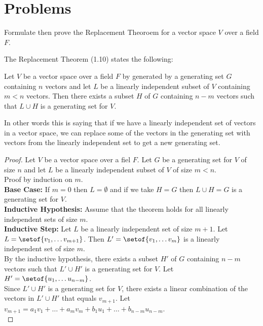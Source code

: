 \documentclass[answers,12pt,addpoints]{exam}
\begin{document}
\section{Problems}
\begin{questions}
    \question Formulate then prove the Replacement Theoroem for a vector space $V$ over a field $F$.\\
    \begin{solution}
        The Replacement Theorem (1.10) states the following: 
        \begin{theorem}
            Let $V$ be a vector space over a field $F$ by generated by a generating set $G$ containing $n$ vectors and let $L$ be a linearly independent subset of $V$ containing $m < n$ vectors. Then there exists a subset $H$ of $G$ containing $n-m$ vectors such that $L \cup H$ is a generating set for $V$.
        \end{theorem}
        In other words this is saying that if we have a linearly independent set of vectors in a vector space, we can replace some of the vectors in the generating set with vectors from the linearly independent set to get a new generating set.\\
        \begin{proof}
            Let $V$ be a vector space over a fiel $F$. Let $G$ be a generating set for $V$ of size $n$ and let $L$ be a linearly independent subset of $V$ of size $m < n$. \\
            Proof by induction on $m$.\\
            \textbf{Base Case:} If $m =0$ then $L = \emptyset$ and if we take $H = G$ then $L \cup H = G$ is a generating set for $V$.\\
            \textbf{Inductive Hypothesis:} Assume that the theorem holds for all linearly independent sets of size $m$.\\
            \textbf{Inductive Step:} Let $L$ be a linearly independent set of size $m+1$. Let $L = \setof{v_1, \dots v_{m+1}}$. Then $L' = \setof{v_1, \dots v_m}$ is a linearly independent set of size $m$.\\
            By the inductive hypothesis, there exists a subset $H'$ of $G$ containing $n-m$ vectors such that $L' \cup H'$ is a generating set for $V$. Let $H' = \setof{u_1 , \dots u_{n-m}}$.\\
            Since $L' \cup H'$ is a generating set for $V$, there exists a linear combination of the vectors in $L' \cup H'$ that equals $v_{m+1}$. Let $v_{m+1} = a_1v_1 + \dots + a_mv_m + b_1u_1 + \dots + b_{n-m}u_{n-m}$. \\

\end{proof}
\end{solution}
\end{questions}
\end{document}
